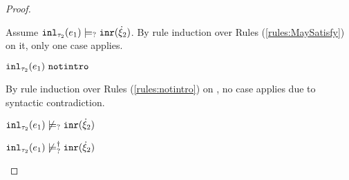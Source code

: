 \begin{proof}
\begin{byCases}
\begin{byCases}
\begin{pfsteps*}
        \end{pfsteps*}
        Assume $\mathtt{inl}_{\tau_2}({e_1}) \models_{?} \mathtt{inr}(\dot{\xi}_2)$. By rule induction over Rules (\ref{rules:MaySatisfy}) on it, only one case applies.
        \begin{byCases}
        \item[\text{(\ref{rule:CMSNotIntro})}]
            \begin{pfsteps*}
            \item $\mathtt{inl}_{\tau_2}({e_1}) ~\mathtt{notintro}$  
            \end{pfsteps*}
            By rule induction over Rules (\ref{rules:notintro}) on , no case applies due to syntactic contradiction.
        \end{byCases}
        \begin{pfsteps*}
        \item $\mathtt{inl}_{\tau_2}({e_1}) \not\models_{?} \mathtt{inr}(\dot{\xi}_2)$  
        \item $\mathtt{inl}_{\tau_2}({e_1}) \not\models_{?}^{\dag} \mathtt{inr}(\dot{\xi}_2)$ 
        \end{pfsteps*}
        

\end{byCases}
\end{byCases}
\end{proof}
